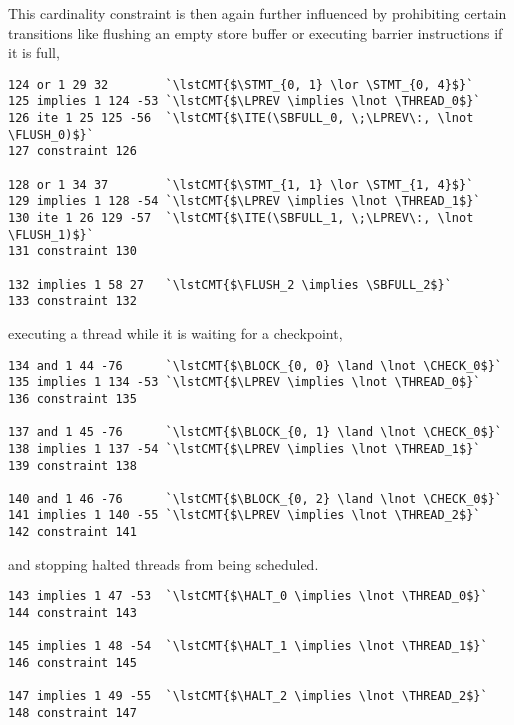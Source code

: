 \noindent
This cardinality constraint is then again further influenced
by prohibiting certain transitions like
flushing an empty store buffer or executing barrier instructions if it is full,
\begin{lstlisting}[style=btor2]
124 or 1 29 32        `\lstCMT{$\STMT_{0, 1} \lor \STMT_{0, 4}$}`
125 implies 1 124 -53 `\lstCMT{$\LPREV \implies \lnot \THREAD_0$}`
126 ite 1 25 125 -56  `\lstCMT{$\ITE(\SBFULL_0, \;\LPREV\:, \lnot \FLUSH_0)$}`
127 constraint 126

128 or 1 34 37        `\lstCMT{$\STMT_{1, 1} \lor \STMT_{1, 4}$}`
129 implies 1 128 -54 `\lstCMT{$\LPREV \implies \lnot \THREAD_1$}`
130 ite 1 26 129 -57  `\lstCMT{$\ITE(\SBFULL_1, \;\LPREV\:, \lnot \FLUSH_1)$}`
131 constraint 130

132 implies 1 58 27   `\lstCMT{$\FLUSH_2 \implies \SBFULL_2$}`
133 constraint 132
\end{lstlisting}

\noindent
executing a thread while it is waiting for a checkpoint,
\begin{lstlisting}[style=btor2]
134 and 1 44 -76      `\lstCMT{$\BLOCK_{0, 0} \land \lnot \CHECK_0$}`
135 implies 1 134 -53 `\lstCMT{$\LPREV \implies \lnot \THREAD_0$}`
136 constraint 135

137 and 1 45 -76      `\lstCMT{$\BLOCK_{0, 1} \land \lnot \CHECK_0$}`
138 implies 1 137 -54 `\lstCMT{$\LPREV \implies \lnot \THREAD_1$}`
139 constraint 138

140 and 1 46 -76      `\lstCMT{$\BLOCK_{0, 2} \land \lnot \CHECK_0$}`
141 implies 1 140 -55 `\lstCMT{$\LPREV \implies \lnot \THREAD_2$}`
142 constraint 141
\end{lstlisting}

\noindent
and stopping halted threads from being scheduled.
\begin{lstlisting}[style=btor2]
143 implies 1 47 -53  `\lstCMT{$\HALT_0 \implies \lnot \THREAD_0$}`
144 constraint 143

145 implies 1 48 -54  `\lstCMT{$\HALT_1 \implies \lnot \THREAD_1$}`
146 constraint 145

147 implies 1 49 -55  `\lstCMT{$\HALT_2 \implies \lnot \THREAD_2$}`
148 constraint 147
\end{lstlisting}

